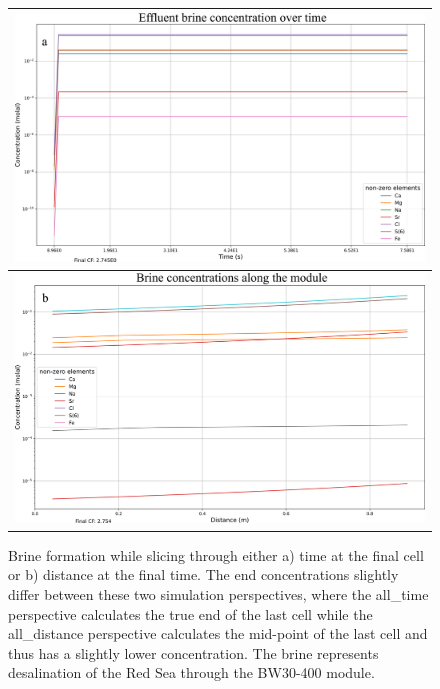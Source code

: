 \begin{supplementary}
\begin{figure}
    \centering
    \begin{tabular}{c}
        \includegraphics[width=\linewidth]{images/ROSSpy/sensitivity_analyses/simulation_perspective/all_time_brine.png} \\ \midrule
        \includegraphics[width=\linewidth]{images/ROSSpy/sensitivity_analyses/simulation_perspective/all_distance_brine.png}
    \end{tabular}
    \caption{
        Brine formation while slicing through either a) time at the final cell or b) distance at the final time. The end concentrations slightly differ between these two simulation perspectives, where the all\_time perspective calculates the true end of the last cell while the all\_distance perspective calculates the mid-point of the last cell and thus has a slightly lower concentration. The brine represents desalination of the Red Sea through the BW30-400 module.
    }
    \label{brine_perspectives}
\end{figure}


\end{supplementary}
